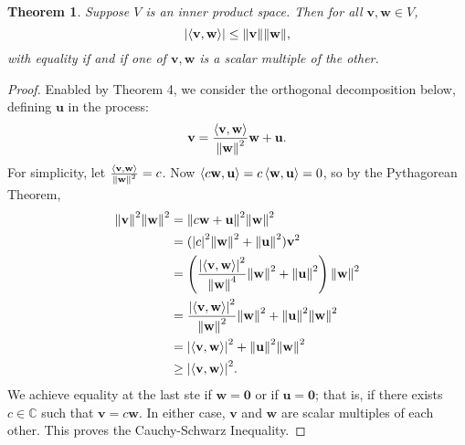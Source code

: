 \documentclass[11pt]{article}
\renewcommand{\vec}[1]{\mathbf{#1}}
\newtheorem{theorem}{Theorem}
\begin{document}
\begin{theorem}
	Suppose $V$ is an inner product space. Then for all $\vec{v}, \vec{w} \in V$,
	\[
		\abs{\ev{\vec{v}, \vec{w}}} \le \norm{\vec{v}} \norm{\vec{w}},
	\]
	with equality if and if one of $\vec{v}, \vec{w}$ is a scalar multiple of the other. 
\end{theorem}
\begin{adjustwidth}{1cm}{}
	\begin{proof}
		Enabled by Theorem 4, we consider the orthogonal decomposition below, defining $\vec{u}$ in the process:
		\[
			\vec{v} = \frac{\ev{\vec{v}, \vec{w}}}{\norm{\vec{w}}^{2}} \vec{w} + \vec{u}.
		\]
		For simplicity, let $\frac{\ev{\vec{v}, \vec{w}}}{\norm{\vec{w}}^{2}} = c$. Now $\ev{c \vec{w}, \vec{u}} = c \ev{\vec{w}, \vec{u}} = 0$, so by the Pythagorean Theorem,
		\begin{align*}
			\norm{\vec{v}}^{2} \norm{\vec{w}}^{2} &= \norm{c \vec{w} + \vec{u}}^{2}\norm{\vec{w}}^{2} \\
			&= (\abs{c}^{2} \norm{\vec{w}}^{2} + \norm{\vec{u}}^{2}) \vec{v}^{2} \\
			&= \left( \frac{\abs{\ev{\vec{v}, \vec{w}}}^{2}}{\norm{\vec{w}}^{4}} \norm{\vec{w}}^{2} + \norm{\vec{u}}^{2} \right) \norm{\vec{w}}^{2} \\
			&= \frac{\abs{\ev{\vec{v}, \vec{w}}}^{2}}{\norm{\vec{w}}^{2}} \norm{\vec{w}}^{2} + \norm{\vec{u}}^{2} \norm{\vec{w}}^{2} \\
			&= \abs{\ev{\vec{v}, \vec{w}}}^{2} + \norm{\vec{u}}^{2} \norm{\vec{w}}^{2} \\
			&\ge \abs{\ev{\vec{v}, \vec{w}}}^{2}.
		\end{align*} 
		We achieve equality at the last ste if $\vec{w} = \vec{0}$ or if $\vec{u} = \vec{0}$; that is, if there exists $c \in \mathbb{C}$ such that $\vec{v} = c \vec{w}$. In either case, $\vec{v}$ and $\vec{w}$ are scalar multiples of each other. This proves the Cauchy-Schwarz Inequality.
	\end{proof}
\end{adjustwidth}
\end{document}
